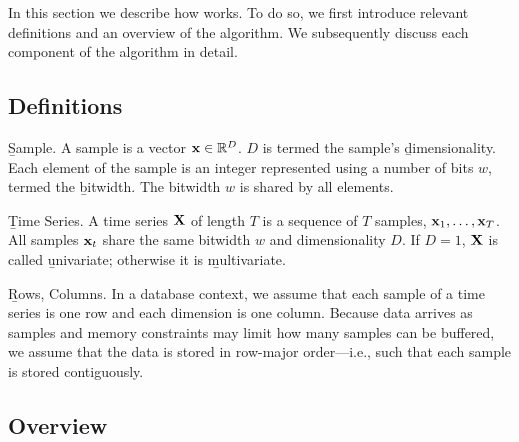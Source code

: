 
In this section we describe how \minesp works. To do so, we first introduce relevant definitions and an overview of the algorithm. We subsequently discuss each component of the algorithm in detail.

\vspace{2mm}
\subsection{Definitions}
\vspace{-2mm}
\begin{Definition} \b{Sample.} A sample is a vector $\mathbf{x} \in \mathbb{R}^D$. $D$ is termed the sample's \b{dimensionality}. Each element of the sample is an integer represented using a number of bits $w$, termed the \b{bitwidth}. The bitwidth $w$ is shared by all elements.
\end{Definition}
\vspace{-5mm}
\begin{Definition} \b{Time Series.} A time series $\mathbf{X}$ of length $T$ is a sequence of $T$ samples, $\mathbf{x}_1,\ldots,\mathbf{x}_T$. All samples $\mathbf{x}_t$ share the same bitwidth $w$ and dimensionality $D$. If $D = 1$, $\mathbf{X}$ is called \b{univariate}; otherwise it is \b{multivariate}.
\end{Definition}
\vspace{-5mm}
\begin{Definition} \b{Rows, Columns.} In a database context, we assume that each sample of a time series is one row and each dimension is one column. Because data arrives as samples and memory constraints may limit how many samples can be buffered, we assume that the data is stored in row-major order---i.e., such that each sample is stored contiguously.
\end{Definition}

\subsection{Overview}

